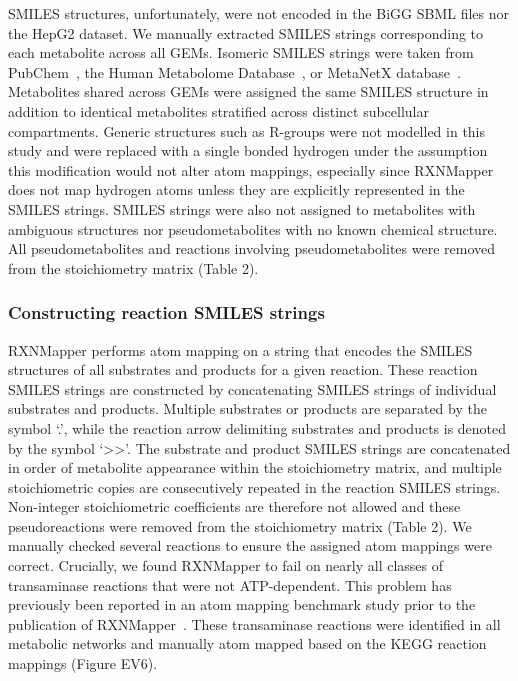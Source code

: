 \documentclass[12pt]{article}
\begin{document}
SMILES structures, unfortunately, were not encoded in the BiGG SBML files
nor the HepG2 dataset. We manually extracted SMILES strings
corresponding to each metabolite across all GEMs. Isomeric SMILES strings
were taken from PubChem~\citep{KimSunghwan2023P2u}, the Human Metabolome
Database~\citep{WishartDavidS2022H5tH}, or MetaNetX
database~\citep{MorettiSebastien2021Munf}. Metabolites shared across GEMs
were assigned the same SMILES structure in addition to identical
metabolites stratified across distinct subcellular compartments. Generic
structures such as R-groups were not modelled in this study and were
replaced with a single bonded hydrogen under the assumption this
modification would not alter atom mappings, especially since
RXNMapper does not map hydrogen atoms unless they are explicitly
represented in the SMILES strings. SMILES strings were also not assigned
to metabolites with ambiguous structures nor pseudometabolites with no
known chemical structure. All pseudometabolites and reactions involving
pseudometabolites were removed from the stoichiometry matrix (Table 2).

\subsubsection*{Constructing reaction SMILES strings}

RXNMapper performs atom mapping on a string that encodes the SMILES
structures of all substrates and products for a given reaction. These
reaction SMILES strings are constructed by concatenating SMILES strings of
individual substrates and products. Multiple substrates or products are
separated by the symbol `.', while the reaction arrow delimiting
substrates and products is denoted by the symbol `>>'. The substrate
and product SMILES strings are concatenated in order of metabolite
appearance within the stoichiometry matrix, and multiple stoichiometric
copies are consecutively repeated in the reaction SMILES strings.
Non-integer stoichiometric coefficients are therefore not allowed and these
pseudoreactions were removed from the stoichiometry matrix (Table 2). We
manually checked several reactions to ensure the assigned atom mappings were
correct. Crucially, we found RXNMapper to fail on nearly all classes of
transaminase reactions that were not ATP-dependent. This problem has previously
been reported in an atom mapping benchmark study prior to the publication of
RXNMapper~\citep{PreciatGonzalezGermanA.2017Ceoa}. These transaminase reactions
were identified in all metabolic networks and manually atom mapped based
on the KEGG reaction mappings (Figure EV6).
\end{document}
